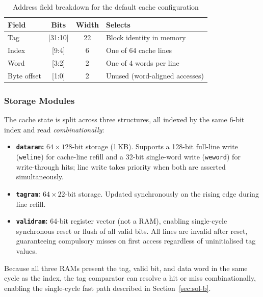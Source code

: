 \documentclass[conference]{IEEEtran}
\renewcommand{\_}{\textunderscore\allowbreak{}}
\begin{document}
\begin{table}[!t]
  \centering
  \caption{Address field breakdown for the default cache configuration}
  \label{tab:addr}
  \renewcommand{\arraystretch}{1.25}
  \small
  \begin{tabular}{@{}lccl@{}}
    \toprule
    \textbf{Field} & \textbf{Bits} & \textbf{Width} & \textbf{Selects} \\
    \midrule
    Tag        & {[}31:10{]}  & 22 & Block identity in memory \\
    Index      & {[}9:4{]}    & 6  & One of 64 cache lines \\
    Word       & {[}3:2{]}    & 2  & One of 4 words per line \\
    Byte offset& {[}1:0{]}    & 2  & Unused (word-aligned accesses) \\
    \bottomrule
  \end{tabular}
\end{table}

\subsubsection{Storage Modules}

The cache state is split across three structures, all indexed by the
same 6-bit index and read \emph{combinationally}:

\begin{itemize}
  \item \textbf{\texttt{data\_ram}:} $64 \times 128$-bit storage
        (1\,KB). Supports a 128-bit full-line write (\texttt{we\_line})
        for cache-line refill and a 32-bit single-word write
        (\texttt{we\_word}) for write-through hits; line write takes
        priority when both are asserted simultaneously.
  \item \textbf{\texttt{tag\_ram}:} $64 \times 22$-bit storage.
        Updated synchronously on the rising edge during line refill.
  \item \textbf{\texttt{valid\_ram}:} 64-bit register vector (not a
        RAM), enabling single-cycle synchronous reset or flush of all
        valid bits. All lines are invalid after reset, guaranteeing
        compulsory misses on first access regardless of uninitialised
        tag values.
\end{itemize}

Because all three RAMs present the tag, valid bit, and data word in the
same cycle as the index, the tag comparator can resolve a hit or miss
combinationally, enabling the single-cycle fast path described in
Section~\ref{sec:sol-b}.
\end{document}
